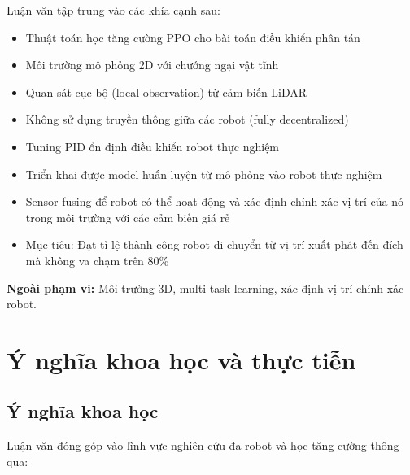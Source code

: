 Luận văn tập trung vào các khía cạnh sau:

\begin{itemize}
    \item Thuật toán học tăng cường PPO cho bài toán điều khiển phân tán
    \item Môi trường mô phỏng 2D với chướng ngại vật tĩnh
    \item Quan sát cục bộ (local observation) từ cảm biến LiDAR
    \item Không sử dụng truyền thông giữa các robot (fully decentralized)
    \item Tuning PID ổn định điều khiển robot thực nghiệm
    \item Triển khai được model huấn luyện từ mô phỏng vào robot thực nghiệm
    \item Sensor fusing để robot có thể hoạt động và xác định chính xác vị trí của nó trong môi trường với các cảm biến giá rẻ
    \item Mục tiêu: Đạt tỉ lệ thành công robot di chuyển từ vị trí xuất phát đến đích mà không va chạm trên 80\%
\end{itemize}

\textbf{Ngoài phạm vi:} Môi trường 3D, multi-task learning, xác định vị trí chính xác robot.


\section{Ý nghĩa khoa học và thực tiễn}
\label{sec:significance}

\subsection{Ý nghĩa khoa học}

Luận văn đóng góp vào lĩnh vực nghiên cứu đa robot và học tăng cường thông qua:

